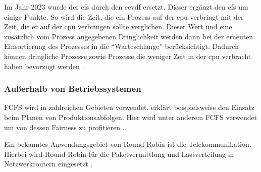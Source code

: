 Im Jahr 2023 wurde der \ac{cfs} durch den \ac{eevdf} ersetzt. Dieser ergänzt den \ac{cfs} um einige Punkte.
So wird die Zeit, die ein Prozess auf der \ac{cpu} verbringt mit der Zeit, die er auf der \ac{cpu} verbringen sollte verglichen. Dieser Wert und eine zusätzlich vom Prozess angegebenen Dringlichkeit werden dann bei der erneuten Einsortierung des Prozesses in die \enquote{Warteschlange} berücksichtigt.
Dadurch können dringliche Prozesse sowie Prozesse die weniger Zeit in der \ac{cpu} verbracht haben bevorzugt werden \autocite{Muller.01112023}.


\subsubsection{Außerhalb von Betriebssystemen}
\ac{FCFS} wird in zahlreichen Gebieten verwendet.  erklärt beispielsweise den Einsatz beim Planen von Produktionsabfolgen. Hier wird unter anderem \ac{FCFS} verwendet um von dessen Fairness zu profitieren \Autocite{Groover.2016}.

Ein bekanntes Anwendungsgebiet von Round Robin ist die Telekommunikation. Hierbei wird Round Robin für die Paketvermittlung und Lastverteilung in Netzwerkroutern eingesetzt \Autocite{Kurose.2010}.
